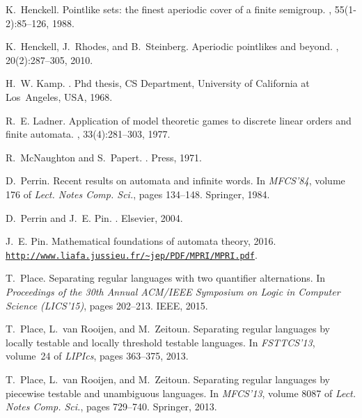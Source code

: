 \documentclass{CSML}
\theoremstyle{plain}
\begin{document}
\begin{thebibliography}{10}
K.~Henckell.
\newblock Pointlike sets: the finest aperiodic cover of a finite semigroup.
, 55(1-2):85--126, 1988.

K.~Henckell, J.~Rhodes, and B.~Steinberg.
\newblock Aperiodic pointlikes and beyond.
, 20(2):287--305, 2010.

H.~W. Kamp.
.
\newblock Phd thesis, CS Department, University of California at Los~Angeles,
  USA, 1968.

R.~E. Ladner.
\newblock Application of model theoretic games to discrete linear orders and
  finite automata.
, 33(4):281--303, 1977.

R.~McNaughton and S.~Papert.
.
 Press, 1971.

D.~Perrin.
\newblock Recent results on automata and infinite words.
\newblock In {\em MFCS'84}, volume 176 of {\em Lect. Notes Comp. Sci.}, pages
  134--148. Springer, 1984.

D.~Perrin and J.~E. Pin.
.
\newblock Elsevier, 2004.

J.~E. Pin.
\newblock Mathematical foundations of automata theory, 2016.\\
\newblock \texttt{\url{http://www.liafa.jussieu.fr/~jep/PDF/MPRI/MPRI.pdf}}.

T.~Place.
\newblock Separating regular languages with two quantifier alternations.
\newblock In {\em Proceedings of the 30th Annual ACM/IEEE Symposium on Logic in
  Computer Science (LICS'15)}, pages 202--213. IEEE, 2015.

T.~Place, L.~van Rooijen, and M.~Zeitoun.
\newblock Separating regular languages by locally testable and locally
  threshold testable languages.
\newblock In {\em FSTTCS'13}, volume~24 of {\em LIPIcs}, pages 363--375, 2013.

T.~Place, L.~{van Rooijen}, and M.~Zeitoun.
\newblock Separating regular languages by piecewise testable and unambiguous
  languages.
\newblock In {\em MFCS'13}, volume 8087 of {\em Lect. Notes Comp. Sci.}, pages
  729--740. Springer, 2013.


\end{thebibliography}
\end{document}
